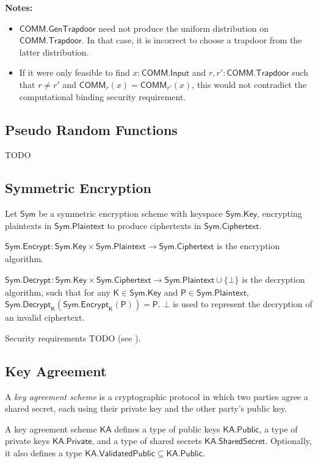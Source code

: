 \documentclass{article}
\newcommand{\callout}[1]{\vspace{2ex plus 2pt minus 2pt}\noindent\textbf{#1}\hspace{1em}}
\newenvironment{pnotes}{\callout{Notes:}\begin{itemize}}{\end{itemize}}
\newcommand{\typecolon}{:}
\newcommand{\setof}[1]{\{{#1}\}}
\newcommand{\union}{\cup}
\newcommand{\maybe}[1]{{#1} \union \setof{\bot}}
\newcommand{\CommitAlg}{\mathsf{COMM}}
\newcommand{\Commit}[1]{\CommitAlg_{#1}}
\newcommand{\CommitTrapdoor}{\CommitAlg\mathsf{.Trapdoor}}
\newcommand{\CommitGenTrapdoor}{\CommitAlg\mathsf{.GenTrapdoor}}
\newcommand{\CommitInput}{\CommitAlg\mathsf{.Input}}
\newcommand{\Sym}{\mathsf{Sym}}
\newcommand{\SymEncrypt}[1]{\Sym\mathsf{.Encrypt}_{#1}}
\newcommand{\SymDecrypt}[1]{\Sym\mathsf{.Decrypt}_{#1}}
\newcommand{\SymPlaintext}{\Sym\mathsf{.Plaintext}}
\newcommand{\SymCiphertext}{\Sym\mathsf{.Ciphertext}}
\newcommand{\SymKey}{\Sym\mathsf{.Key}}
\newcommand{\Plaintext}{\mathsf{P}}
\newcommand{\Key}{\mathsf{K}}
\newcommand{\KA}{\mathsf{KA}}
\newcommand{\KAPublic}{\KA\mathsf{.Public}}
\newcommand{\KAValidatedPublic}{\KA\mathsf{.ValidatedPublic}}
\newcommand{\KAPrivate}{\KA\mathsf{.Private}}
\newcommand{\KASharedSecret}{\KA\mathsf{.SharedSecret}}
\begin{document}
\begin{pnotes}[leftmargin=2em]
  \item $\CommitGenTrapdoor$ need not produce the uniform distribution on $\CommitTrapdoor$.
        In that case, it is incorrect to choose a trapdoor from the latter distribution.
  \item If it were only feasible to find $x \typecolon \CommitInput$ and
        $r, r' \typecolon \CommitTrapdoor$ such that $r \neq r'$ and
        $\Commit{r}(x) = \Commit{r'}(x)$, this would not contradict
        the computational binding security requirement.
\end{pnotes}


\subsection{Pseudo Random Functions} \label{prf}

TODO


\subsection{Symmetric Encryption} \label{symenc}

Let $\Sym$ be a symmetric encryption scheme with keyspace $\SymKey$, encrypting
plaintexts in $\SymPlaintext$ to produce ciphertexts in $\SymCiphertext$.

$\SymEncrypt{} \typecolon \SymKey \times \SymPlaintext \rightarrow \SymCiphertext$
is the encryption algorithm.

$\SymDecrypt{} \typecolon \SymKey \times \SymCiphertext \rightarrow
\maybe{\SymPlaintext}$ is the decryption algorithm, such that
for any $\Key \in \SymKey$ and $\Plaintext \in \SymPlaintext$,
$\SymDecrypt{\Key}(\SymEncrypt{\Key}(\Plaintext)) = \Plaintext$.
$\bot$ is used to represent the decryption of an invalid ciphertext.

Security requirements TODO (see \cite{BN2007}).


\subsection{Key Agreement} \label{keyagreement}

A \emph{key agreement scheme} is a cryptographic protocol in which two parties agree
a shared secret, each using their private key and the other party's public key.

A key agreement scheme $\KA$ defines a type of public keys $\KAPublic$, a type
of private keys $\KAPrivate$, and a type of shared secrets $\KASharedSecret$.
Optionally, it also defines a type $\KAValidatedPublic \subseteq \KAPublic$.
\end{document}
